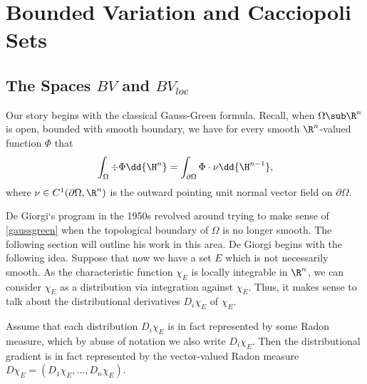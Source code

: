 \documentclass[../main.tex]{subfiles}
\begin{document}
\section{Bounded Variation and Cacciopoli Sets}

\subsection{The Spaces $ BV $ and $ BV_{loc} $}


\begin{figure}[H]

\end{figure}

Our story begins with the classical Gauss-Green formula. Recall, when $ \Omega\sub \R^{n} $ is open, bounded with smooth boundary, we have for every smooth $ \R^{n} $-valued function $ \Phi $ that
\begin{equation}\label{gaussgreen}
    \int_{\Omega} \div{\Phi} \dd{\H^{n}} = \int_{\partial \Omega} \Phi\cdot \nu \dd{\H^{n-1}},
\end{equation}
where $ \nu\in C^{1}(\partial \Omega, \R^{n})  $ is the outward pointing unit normal vector field on $ \partial \Omega $.



De Giorgi`s program in the 1950s revolved around trying to make sense of \eqref{gaussgreen} when the topological boundary of $ \Omega $ is no longer smooth. The following section will outline his work in this area. De Giorgi begins with the following idea. Suppose that now we have a set $ E $ which is not necessarily smooth. As the characteristic function $ \chi_{E} $ is locally integrable in $ \R^{n} $, we can consider $ \chi_{E} $ as a distribution via integration against $ \chi_{E} $. Thus, it makes sense to talk about the distributional derivatives $ D_{i}\chi_{E} $ of $ \chi_{E} $. 

Assume that each distribution $ D_{i} \chi_{E} $ is in fact represented by some Radon measure, which by abuse of notation we also write $ D_{i} \chi_{E} $. Then the distributional gradient is in fact represented by the vector-valued Radon measure $ D\chi_{E} = (D_{1} \chi_{E}, \ldots, D_{n}\chi_{E}) $.
\end{document}
